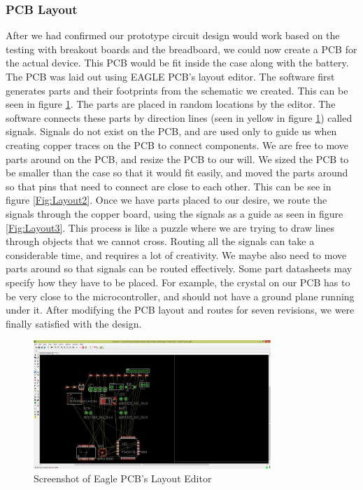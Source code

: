 \subsubsection{PCB Layout}
After we had confirmed our prototype circuit design would work based on the testing with breakout boards and the breadboard,
we could now create a PCB for the actual device.
This PCB would be fit inside the case along with the battery.
The PCB was laid out using EAGLE PCB's layout editor.
The software first generates parts and their footprints from the schematic we created.
This can be seen in figure \ref{Fig:Layout1}.
The parts are placed in random locations by the editor.
The software connects these parts by direction lines (seen in yellow in figure \ref{Fig:Layout1}) called signals.
Signals do not exist on the PCB,
and are used only to guide us when creating copper traces on the PCB to connect components.
We are free to move parts around on the PCB, and resize the PCB to our will.
We sized the PCB to be smaller than the case so that it would fit easily, and moved the parts around so that pins that need to connect are close to each other.
This can be see in figure \ref{Fig:Layout2}.
Once we have parts placed to our desire,
we route the signals through the copper board,
using the signals as a guide as seen in figure \ref{Fig:Layout3}.
This process is like a puzzle where we are trying to draw lines through objects that we cannot cross.
Routing all the signals can take a considerable time,
and requires a lot of creativity.
We maybe also need to move parts around so that signals can be routed effectively.
Some part datasheets may specify how they have to be placed.
For example,
the crystal on our PCB has to be very close to the microcontroller,
and should not have a ground plane running under it.
After modifying the PCB layout and routes for seven revisions,
we were finally satisfied with the design.
\begin{figure}
\begin{center}
\includegraphics[width=0.8\textwidth]{images/Layout1.jpg}
\caption{Screenshot of Eagle PCB's Layout Editor}
\label{Fig:Layout1}
\end{center}
\end{figure}
